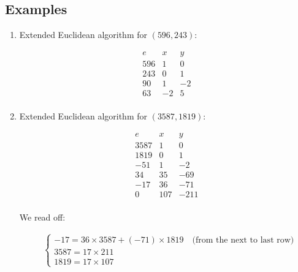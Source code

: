 \documentclass[11pt]{article}
\begin{document}
\subsection{Examples}

\begin{enumerate}
    \item Extended Euclidean algorithm for \((596, 243)\):

          \[
              \begin{array}{c|c|c}
                  e   & x  & y  \\
                  \hline
                  596 & 1  & 0  \\
                  243 & 0  & 1  \\
                  90  & 1  & -2 \\
                  63  & -2 & 5  \\
              \end{array}
          \]

    \item Extended Euclidean algorithm for \((3587, 1819)\):

          \[
              \begin{array}{c|c|c}
                  e    & x   & y    \\
                  \hline
                  3587 & 1   & 0    \\
                  1819 & 0   & 1    \\
                  -51  & 1   & -2   \\
                  34   & 35  & -69  \\
                  -17  & 36  & -71  \\
                  0    & 107 & -211 \\
              \end{array}
          \]

          We read off:

          \[
              \begin{aligned}
                   & \left\{
                  \begin{array}{l}
                      -17 = 36 \times 3587 + (-71) \times 1819 \quad \text{(from the next to last row)} \\
                      3587 = 17 \times 211                                                              \\
                      1819 = 17 \times 107
                  \end{array}
                  \right.
              \end{aligned}
          \]
\end{enumerate}
\end{document}

